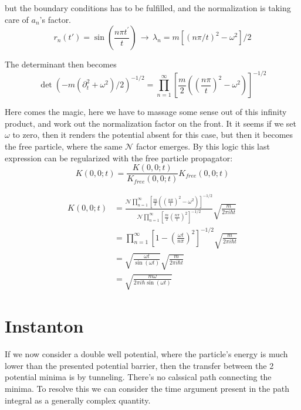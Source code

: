 \documentclass[12pt,a4paper]{article}
\numberwithin{equation}{section}
\begin{document}
but the boundary conditions has to be fulfilled, and the normalization is taking care of $a_n$'s factor.
\begin{equation}
r_n(t') = \sin\left(\frac{n \pi t^{'}}{t}\right) \,\rightarrow\, \lambda_n = m[(n\pi/t)^2 - \omega^2]/2
\end{equation}

The determinant then becomes
\begin{equation}
\det (-m(\partial_t^2 + \omega^2)/2)^{-1/2} =   \prod_{n=1}^\infty \left[ \frac{m}{2}\left(\left( \frac{n \pi}{t}  \right)^2 - \omega^2\right) \right]^{-1/2}
\end{equation}

Here comes the magic, here we have to massage some sense out of this infinity product, and work out the normalization factor on the front. It it seems if we set $\omega$ to zero, then it renders the potential absent for this case, but then it becomes the free particle, where the same $\mathcal{N}$ factor emerges. By this logic this last expression can be regularized with the free particle propagator:
\begin{equation}
K(0,0;t) = \frac{K(0,0;t)}{K_{free}(0,0;t)}K_{free}(0,0;t)
\end{equation}

\begin{align}
K(0,0;t) &= \frac{\mathcal{N} \prod_{n=1}^\infty \left[ \frac{m}{2}\left(\left( \frac{n \pi}{t}  \right)^2 - \omega^2\right) \right]^{-1/2}}{\mathcal{N} \prod_{n=1}^\infty \left[ \frac{m}{2}\left( \frac{n \pi}{t}  \right)^2  \right]^{-1/2}} \sqrt{\frac{m}{2 \pi i \hbar t}} \\
&= \prod_{n=1}^\infty \left[1- \left(\frac{\omega t}{n\pi}\right)^2  \right]^{-1/2} \sqrt{\frac{m}{2 \pi i \hbar t}} \\
&= \sqrt{\frac{\omega t}{\sin(\omega t)}} \sqrt{\frac{m}{2 \pi i \hbar t}}\\
&= \sqrt{\frac{m\omega}{2\pi i \hbar \sin(\omega t)}}
\end{align}

\newpage
\section{Instanton}
If we now consider a double well potential, where the particle's energy is much lower than the presented potential barrier, then the transfer between the 2 potential minima is by tunneling. There's no calssical path connecting the minima. To resolve this we can consider the time argument present in the path integral as a generally complex quantity.
\end{document}
